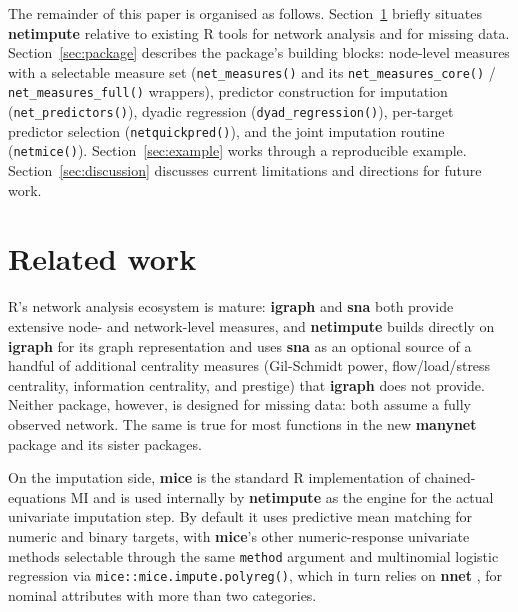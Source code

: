 \documentclass[11pt,a4paper]{article}
\newcommand{\pkg}[1]{\textbf{#1}}
\newcommand{\code}[1]{\texttt{#1}}
\newcommand{\proglang}[1]{\textsf{#1}}
\begin{document}
The remainder of this paper is organised as follows. Section~\ref{sec:related}
briefly situates \pkg{netimpute} relative to existing \proglang{R} tools for
network analysis and for missing data. Section~\ref{sec:package} describes
the package's building blocks: node-level measures with a selectable
measure set (\code{net\_measures()} and its \code{net\_measures\_core()} /
\code{net\_measures\_full()} wrappers), predictor construction for
imputation (\code{net\_predictors()}), dyadic regression
(\code{dyad\_regression()}), per-target predictor selection
(\code{netquickpred()}), and the joint imputation routine
(\code{netmice()}). Section~\ref{sec:example} works through a reproducible
example. Section~\ref{sec:discussion} discusses current limitations and
directions for future work.

\section{Related work}
\label{sec:related}

\proglang{R}'s network analysis ecosystem is mature: \pkg{igraph}
\citep{Csardi2006} and \pkg{sna} \citep{Butts2008} both provide extensive
node- and network-level measures, and \pkg{netimpute} builds directly on
\pkg{igraph} for its graph representation and uses \pkg{sna} as an optional
source of a handful of additional centrality measures (Gil-Schmidt power,
flow/load/stress centrality, information centrality, and prestige) that
\pkg{igraph} does not provide. Neither package, however, is designed for
missing data: both assume a fully observed network. The same is true for most functions in the new \pkg{manynet} package \citep{manynet} and its sister packages.

On the imputation side, \pkg{mice} \citep{vanBuuren2011} is the standard
\proglang{R} implementation of chained-equations MI and is used internally
by \pkg{netimpute} as the engine for the actual univariate imputation
step. By default it uses predictive mean matching for numeric and binary targets,
with \pkg{mice}'s other numeric-response univariate methods selectable
through the same \code{method} argument and multinomial
logistic regression via \code{mice::mice.impute.polyreg()}, which in turn
relies on \pkg{nnet} \citep{Venables2002}, for nominal attributes with more
than two categories.
\end{document}
